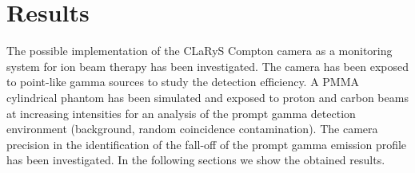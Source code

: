 \section{Results}

The possible implementation of the CLaRyS Compton camera as a monitoring system for ion beam therapy has been investigated. 
The camera has been exposed to point-like gamma sources to study the detection efficiency.
A PMMA cylindrical phantom has been simulated and exposed to proton and carbon beams at increasing intensities for an analysis of the prompt gamma detection environment (background, random coincidence contamination). The camera precision in the identification of the fall-off of the prompt gamma emission profile has been investigated. 
In the following sections we show the obtained results. 


